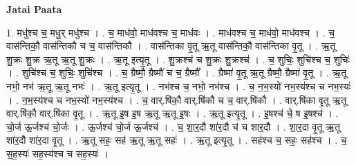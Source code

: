 \documentclass[17pt]{extarticle}
\begin{document}
\textbf{Jatai Paata} \newline

1. मधु॑श्च च॒ मधु॒र् मधु॑श्च । . च॒ माध॑वो॒ माध॑वश्च च॒ माध॑वः । . माध॑वश्च च॒ माध॑वो॒ माध॑वश्च । . च॒ वास॑न्तिकौ॒ वास॑न्तिकौ च च॒ वास॑न्तिकौ । . वास॑न्तिका वृ॒तू ऋ॒तू वास॑न्तिकौ॒ वास॑न्तिका वृ॒तू । . ऋ॒तू शु॒क्रः शु॒क्र ऋ॒तू ऋ॒तू शु॒क्रः । . ऋ॒तू इत्यृ॒तू । . शु॒क्रश्च॑ च शु॒क्रः शु॒क्रश्च॑ । . च॒ शुचिः॒ शुचि॑श्च च॒ शुचिः॑ । . शुचि॑श्च च॒ शुचिः॒ शुचि॑श्च । . च॒ ग्रैष्मौ॒ ग्रैष्मौ॑ च च॒ ग्रैष्मौ᳚ । . ग्रैष्मा॑ वृ॒तू ऋ॒तू ग्रैष्मौ॒ ग्रैष्मा॑ वृ॒तू । . ऋ॒तू नभो॒ नभ॑ ऋ॒तू ऋ॒तू नभः॑ । . ऋ॒तू इत्यृ॒तू । . नभ॑श्च च॒ नभो॒ नभ॑श्च । . च॒ न॒भ॒स्यो॑ नभ॒स्य॑श्च च नभ॒स्यः॑ । . न॒भ॒स्य॑श्च च नभ॒स्यो॑ नभ॒स्य॑श्च । . च॒ वार्.षि॑कौ॒ वार्.षि॑कौ च च॒ वार्.षि॑कौ । . वार्.षि॑का वृ॒तू ऋ॒तू वार्.षि॑कौ॒ वार्.षि॑का वृ॒तू । . ऋ॒तू इ॒ष इ॒ष ऋ॒तू ऋ॒तू इ॒षः । . ऋ॒तू इत्यृ॒तू । . इ॒षश्च॑ चे॒ ष इ॒षश्च॑ । . चो॒र्ज ऊ॒र्जश्च॑ चो॒र्जः । . ऊ॒र्जश्च॑ चो॒र्ज ऊ॒र्जश्च॑ । . च॒ शा॒र॒दौ शा॑र॒दौ च॑ च शार॒दौ । . शा॒र॒दा वृ॒तू ऋ॒तू शा॑र॒दौ शा॑र॒दा वृ॒तू । . ऋ॒तू सहः॒ सह॑ ऋ॒तू ऋ॒तू सहः॑ । . ऋ॒तू इत्यृ॒तू । . सह॑श्च च॒ सहः॒ सह॑श्च । . च॒ स॒ह॒स्यः॑ सह॒स्य॑श्च च सह॒स्यः॑ । \newline
\end{document}
